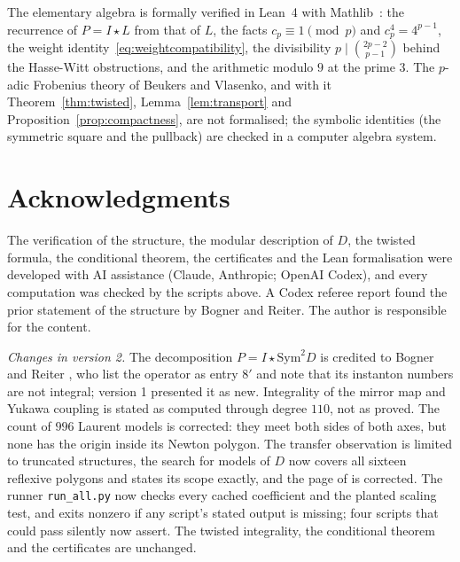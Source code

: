 \documentclass[11pt]{amsart}
\theoremstyle{definition}
\theoremstyle{remark}
\begin{document}
The elementary algebra is formally verified in Lean~4 with Mathlib~\cite{mathlib}: the recurrence of
$P=I\star L$ from that of $L$, the facts $c_p\equiv1\pmod p$ and $c_p^4=4^{p-1}$, the weight
identity~\eqref{eq:weightcompatibility}, the divisibility $p\mid\binom{2p-2}{p-1}$ behind the
Hasse-Witt obstructions, and the arithmetic modulo $9$ at the prime $3$. The $p$-adic Frobenius
theory of Beukers and Vlasenko, and with it Theorem~\ref{thm:twisted}, Lemma~\ref{lem:transport}
and Proposition~\ref{prop:compactness}, are not formalised; the symbolic identities (the symmetric
square and the pullback) are checked in a computer algebra system.

\section*{Acknowledgments}

The verification of the structure, the modular description of $D$, the twisted formula, the conditional
theorem, the certificates and the Lean formalisation were developed with AI assistance (Claude, Anthropic;
OpenAI Codex), and every computation was checked by the scripts above. A Codex referee report found the prior
statement of the structure by Bogner and Reiter. The author is responsible for the content.

\emph{Changes in version 2.} The decomposition $P=I\star\mathrm{Sym}^2D$ is credited to Bogner and Reiter
\cite{BR}, who list the operator as entry $8'$ and note that its instanton numbers are not integral; version 1
presented it as new. Integrality of the mirror map and Yukawa coupling is stated as computed through degree
$110$, not as proved. The count of $996$ Laurent models is corrected: they meet both sides of both axes, but none
has the origin inside its Newton polygon. The transfer observation is limited to truncated structures, the
search for models of $D$ now covers all sixteen reflexive polygons and states its scope exactly, and the page of \cite{AvS} is corrected. The
runner \texttt{run\_all.py} now checks every cached coefficient and the planted scaling test, and exits
nonzero if any script's stated output is missing; four scripts that could pass silently now assert. The twisted integrality, the conditional theorem and the certificates are unchanged.
\end{document}
